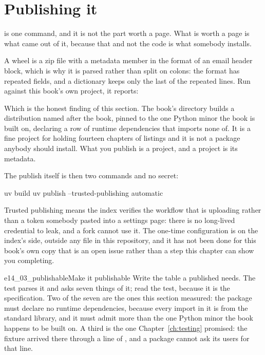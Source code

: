 \section{Publishing it}
\label{sec:ch14-publish}

 is one command, and it is not the part worth a page. What
is worth a page is what came out of it, because that \dash{} and not the
code \dash{} is what somebody installs.


\noindent
A wheel is a zip file with a metadata member in the format of an email
header block, which is why it is parsed rather than split on colons: the
format has repeated fields, and a dictionary keeps only the last of
the repeated  lines. Run against this book's own
project, it reports:


\noindent
Which is the honest finding of this section. The book's 
directory builds a distribution named after the book, pinned to the one
Python minor the book is built on, declaring a row of runtime
dependencies that  imports none of. It is a fine project for holding
fourteen chapters of listings and it is not a package anybody should
install. What you publish is a project, and a project is its metadata.

The publish itself is then two commands and no secret:

\begin{shellcmd}
uv build
uv publish --trusted-publishing automatic
\end{shellcmd}

\noindent
Trusted publishing means the index verifies the workflow that is uploading
rather than a token somebody pasted into a settings page: there is no
long-lived credential to leak, and a fork cannot use it. The one-time
configuration is on the index's side, outside any file in this repository,
and it has not been done for this book's own copy \dash{} that is an open
issue rather than a step this chapter can show you completing.

\begin{exercise}{e14_03_publishable}{Make it publishable}
Write the \code{[project]} table a published  needs. The
test parses it and asks seven things of it; read the test, because it is the
specification. Two of the seven are the ones this section measured: the
package must declare no runtime dependencies, because every import in it is
from the standard library, and it must admit more than the one Python minor
the book happens to be built on. A third is the one
Chapter~\ref{ch:testing} promised: the  fixture arrived there
through a line of , and a package cannot ask its users
for that line.
\end{exercise}

